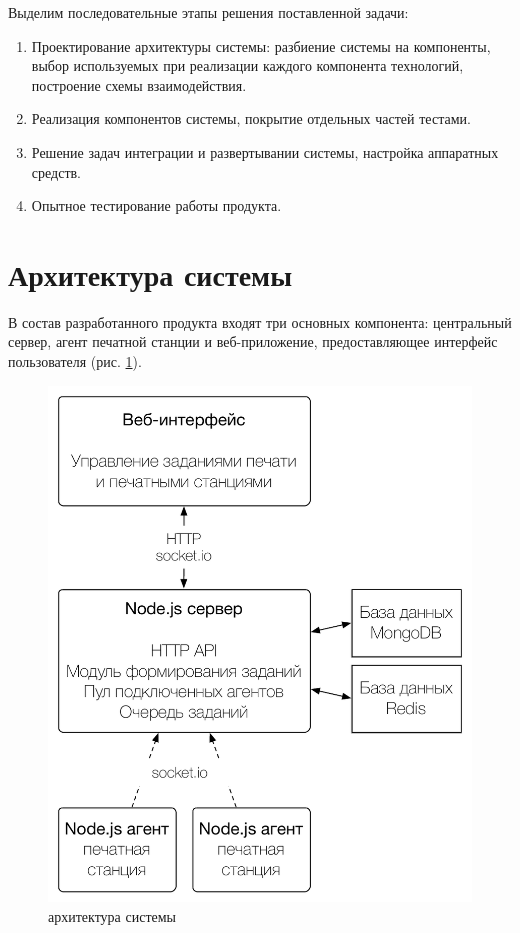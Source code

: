 \documentclass[a4paper,14pt,href,draft]{article}
\begin{document}
Выделим последовательные этапы решения поставленной задачи:
\begin{enumerate}
  \item Проектирование архитектуры системы: разбиение системы на компоненты, выбор используемых при реализации
  каждого компонента технологий, построение схемы взаимодействия.

  \item Реализация компонентов системы, покрытие отдельных частей тестами.

  \item Решение задач интеграции и развертывании системы, настройка аппаратных средств.

  \item Опытное тестирование работы продукта.
\end{enumerate}

\newpage
\section{Архитектура системы}
В состав разработанного продукта входят три основных компонента: центральный сервер, агент печатной станции и
веб-приложение, предоставляющее интерфейс пользователя (рис. \ref{fig:Architecture}).

\begin{figure}[htbp]
\begin{center}
  \includegraphics[scale=0.7]{architecture.pdf}
    \caption{архитектура системы}
    \label{fig:Architecture}
\end{center}
\end{figure}
\end{document}
